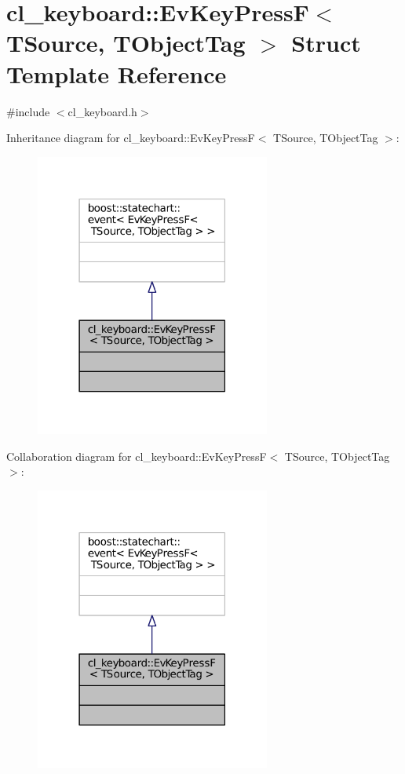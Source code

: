 \hypertarget{structcl__keyboard_1_1EvKeyPressF}{}\section{cl\+\_\+keyboard\+:\+:Ev\+Key\+PressF$<$ T\+Source, T\+Object\+Tag $>$ Struct Template Reference}
\label{structcl__keyboard_1_1EvKeyPressF}


{\ttfamily \#include $<$cl\+\_\+keyboard.\+h$>$}



Inheritance diagram for cl\+\_\+keyboard\+:\+:Ev\+Key\+PressF$<$ T\+Source, T\+Object\+Tag $>$\+:
\nopagebreak
\begin{figure}[H]
\begin{center}
\leavevmode
\includegraphics[width=219pt]{structcl__keyboard_1_1EvKeyPressF__inherit__graph}
\end{center}
\end{figure}


Collaboration diagram for cl\+\_\+keyboard\+:\+:Ev\+Key\+PressF$<$ T\+Source, T\+Object\+Tag $>$\+:
\nopagebreak
\begin{figure}[H]
\begin{center}
\leavevmode
\includegraphics[width=219pt]{structcl__keyboard_1_1EvKeyPressF__coll__graph}
\end{center}
\end{figure}


